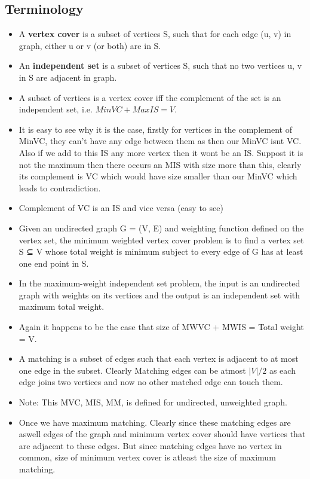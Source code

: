 \documentclass[8pt, a4paper, oneside, twocolumn]{extarticle}
\begin{document}
\subsection{Terminology}
\begin{itemize}
    \item A \textbf{vertex cover} is a subset of vertices S, such that for each edge (u, v) in graph, either u or v (or both) are in S.
    \item An \textbf{independent set} is a subset of vertices S, such that no two vertices u, v in S are adjacent in graph.
    \item A subset of vertices is a vertex cover iff the complement of the set is an independent set, i.e. $MinVC + MaxIS = V$.
    \item It is easy to see why it is the case, firstly for vertices in the complement of MinVC, they can't have any edge between them as then our MinVC isnt VC. Also if we add to this IS any more vertex then it wont be an IS. Suppost it is not the maximum then there occurs an MIS with size more than this, clearly its complement is VC which would have size smaller than our MinVC which leads to contradiction. 
    \item Complement of VC is an IS and vice versa (easy to see)
    \item Given an undirected graph G = (V, E) and weighting function defined on the vertex set, the minimum weighted vertex cover problem is to find a vertex set S ⊆ V whose total weight is minimum subject to every edge of G has at least one end point in S. 
    \item In the maximum-weight independent set problem, the input is an undirected graph with weights on its vertices and the output is an independent set with maximum total weight.
    \item Again it happens to be the case that size of MWVC + MWIS = Total weight = V.
    \item A matching is a subset of edges such that each vertex is adjacent to at most one edge in the subset. Clearly Matching edges can be atmost $|V|/2$ as each edge joins two vertices and now no other matched edge can touch them.
    \item Note: This MVC, MIS, MM, is defined for undirected, unweighted graph.
    \item Once we have maximum matching. Clearly since these matching edges are aswell edges of the graph and minimum vertex cover should have vertices that are adjacent to these edges. But since matching edges have no vertex in common, size of minimum vertex cover is atleast the size of maximum matching.

\end{itemize}
\end{document}
